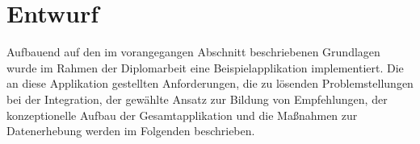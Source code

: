 \section{Entwurf}

Aufbauend auf den im vorangegangen Abschnitt beschriebenen Grundlagen wurde im Rahmen der Diplomarbeit eine Beispielapplikation implementiert. Die an diese Applikation gestellten Anforderungen, die zu lösenden Problemstellungen bei der Integration, der gewählte Ansatz zur Bildung von Empfehlungen, der konzeptionelle Aufbau der Gesamtapplikation und die Maßnahmen zur Datenerhebung werden im Folgenden beschrieben.







